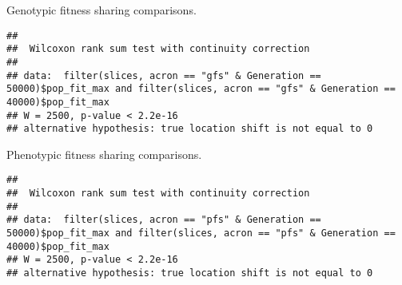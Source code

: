 \documentclass[]{book}
\newenvironment{Shaded}{\begin{snugshade}}{\end{snugshade}}
\newcommand{\DataTypeTok}[1]{\textcolor[rgb]{0.13,0.29,0.53}{#1}}
\newcommand{\DecValTok}[1]{\textcolor[rgb]{0.00,0.00,0.81}{#1}}
\newcommand{\KeywordTok}[1]{\textcolor[rgb]{0.13,0.29,0.53}{\textbf{#1}}}
\newcommand{\NormalTok}[1]{#1}
\newcommand{\OperatorTok}[1]{\textcolor[rgb]{0.81,0.36,0.00}{\textbf{#1}}}
\newcommand{\StringTok}[1]{\textcolor[rgb]{0.31,0.60,0.02}{#1}}
\begin{document}
Genotypic fitness sharing comparisons.

\begin{Shaded}
\end{Shaded}

\begin{verbatim}
## 
##  Wilcoxon rank sum test with continuity correction
## 
## data:  filter(slices, acron == "gfs" & Generation == 50000)$pop_fit_max and filter(slices, acron == "gfs" & Generation == 40000)$pop_fit_max
## W = 2500, p-value < 2.2e-16
## alternative hypothesis: true location shift is not equal to 0
\end{verbatim}

Phenotypic fitness sharing comparisons.

\begin{Shaded}
\end{Shaded}

\begin{verbatim}
## 
##  Wilcoxon rank sum test with continuity correction
## 
## data:  filter(slices, acron == "pfs" & Generation == 50000)$pop_fit_max and filter(slices, acron == "pfs" & Generation == 40000)$pop_fit_max
## W = 2500, p-value < 2.2e-16
## alternative hypothesis: true location shift is not equal to 0
\end{verbatim}
\end{document}
